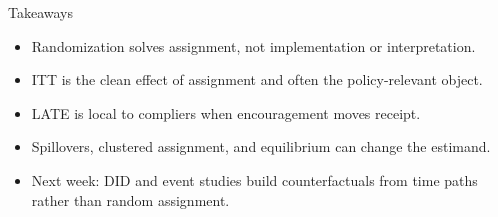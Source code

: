 \documentclass[aspectratio=169,11pt]{beamer}
\begin{document}
\begin{frame}{Takeaways}
\begin{itemize}
    \item Randomization solves assignment, not implementation or interpretation.
    \item ITT is the clean effect of assignment and often the policy-relevant object.
    \item LATE is local to compliers when encouragement moves receipt.
    \item Spillovers, clustered assignment, and equilibrium can change the estimand.
    \item Next week: DID and event studies build counterfactuals from time paths rather than random assignment.
\end{itemize}
\end{frame}
\end{document}
